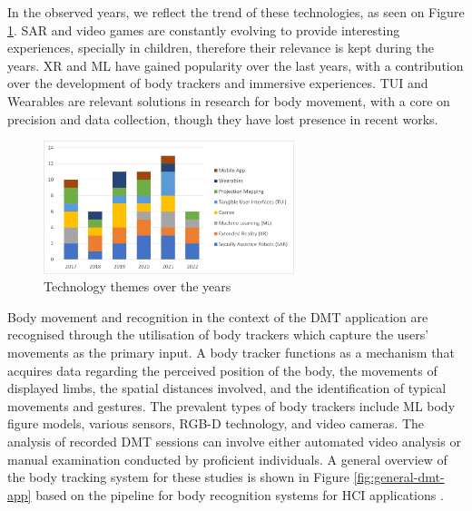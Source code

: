\documentclass[a4paper,fleqn]{cas-sc}
\begin{document}
In the observed years, we reflect the trend of these technologies, as seen on Figure \ref{fig:tech-themes-years}. SAR and video games are constantly evolving to provide interesting experiences, specially in children, therefore their relevance is kept during the years. XR and ML have gained popularity over the last years, with a contribution over the development of body trackers and immersive experiences. TUI and Wearables are relevant solutions in research for body movement, with a core on precision and data collection, though they have lost presence in recent works.

\begin{figure}
	\includegraphics[width=0.65\textwidth]{fig7_tech-themes-years.png}
        \centering
	  \caption{Technology themes over the years}\label{fig:tech-themes-years}
\end{figure}


Body movement and recognition in the context of the DMT application are recognised through the utilisation of body trackers which capture the users' movements as the primary input. A body tracker functions as a mechanism that acquires data regarding the perceived position of the body, the movements of displayed limbs, the spatial distances involved, and the identification of typical movements and gestures. The prevalent types of body trackers include ML body figure models, various sensors, RGB-D technology, and video cameras. The analysis of recorded DMT sessions can involve either automated video analysis or manual examination conducted by proficient individuals. A general overview of the body tracking system for these studies is shown in Figure \ref{fig:general-dmt-app} based on the pipeline for body recognition systems for HCI applications \cite{Ahmed21}.
\end{document}
